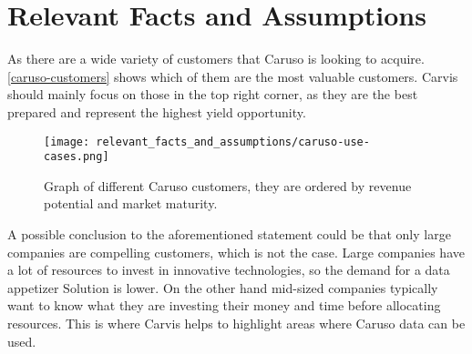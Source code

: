 \chapter{Relevant Facts and Assumptions}


As there are a wide variety of customers that Caruso is looking to acquire. \autoref{caruso-customers} shows which of them are the most valuable customers. Carvis should mainly focus on those in the top right corner, as they are the best prepared and represent the highest yield opportunity.

\begin{figure}[ht]
  \centering
  \texttt{[image: relevant\_facts\_and\_assumptions/caruso-use-cases.png]}
  \caption{Graph of different Caruso customers, they are ordered by revenue potential and market maturity.}
  \label{caruso-customers}
\end{figure}

A possible conclusion to the aforementioned statement could be that only large companies are compelling customers, which is not the case. Large companies have a lot of resources to invest in innovative technologies, so the demand for a data appetizer Solution is lower. On the other hand mid-sized companies typically want to know what they are investing their money and time before allocating resources. This is where Carvis helps to highlight areas where Caruso data can be used.